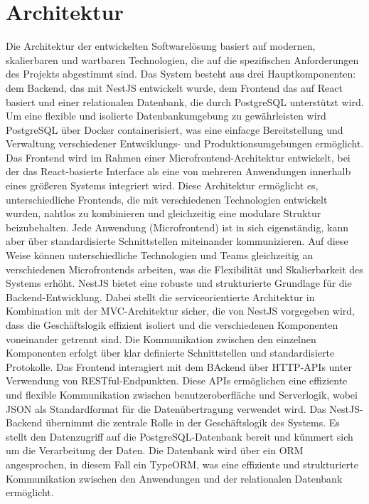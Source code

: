 \section{Architektur}
Die Architektur der entwickelten Softwarelösung basiert auf modernen, skalierbaren und wartbaren Technologien, die auf die spezifischen Anforderungen des Projekts abgestimmt sind. Das System besteht aus drei Hauptkomponenten: dem Backend, das mit NestJS entwickelt wurde, dem Frontend das auf React basiert und einer relationalen Datenbank, die durch PostgreSQL unterstützt wird. Um eine flexible und isolierte Datenbankumgebung zu gewährleisten wird PostgreSQL über Docker containerisiert, was eine einfacge Bereitstellung und Verwaltung verschiedener Entwciklungs- und Produktionsumgebungen ermöglicht.
\newline
\newline
Das Frontend wird im Rahmen einer Microfrontend-Architektur entwickelt, bei der das React-basierte Interface als eine von mehreren Anwendungen innerhalb eines größeren Systems integriert wird. Diese Architektur ermöglicht es, unterschiedliche Frontends, die mit verschiedenen Technologien entwickelt wurden, nahtlos zu kombinieren und gleichzeitig eine modulare Struktur beizubehalten. Jede Anwendung (Microfrontend) ist in sich eigenständig, kann aber über standardisierte Schnittstellen miteinander kommunizieren. Auf diese Weise können unterschiedliche Technologien und Teams gleichzeitig an verschiedenen Microfrontends arbeiten, was die Flexibilität und Skalierbarkeit des Systems erhöht.
\newline
\newline
NestJS bietet eine robuste und strukturierte Grundlage für die Backend-Entwicklung. Dabei stellt die serviceorientierte Architektur in Kombination mit der \ac{MVC}-Architektur sicher, die von NestJS vorgegeben wird, dass die Geschäftslogik effizient isoliert und die verschiedenen Komponenten voneinander getrennt sind.
\newline
Die Kommunikation zwischen den einzelnen Komponenten erfolgt über klar definierte Schnittstellen und standardisierte Protokolle. Das Frontend interagiert mit dem BAckend über HTTP-APIs unter Verwendung von RESTful-Endpunkten. Diese APIs ermöglichen eine effiziente und flexible Kommunikation zwischen benutzeroberfläche und Serverlogik, wobei JSON als Standardformat für die Datenübertragung verwendet wird.
\newline
Das NestJS-Backend übernimmt die zentrale Rolle in der Geschäftslogik des Systems. Es stellt den Datenzugriff auf die PostgreSQL-Datenbank bereit und kümmert sich um die Verarbeitung der Daten. Die Datenbank wird über ein \ac{ORM} angesprochen, in diesem Fall ein TypeORM, was eine effiziente und strukturierte Kommunikation zwischen den Anwendungen und der relationalen Datenbank ermöglicht.
\label{chap:kapitel5}